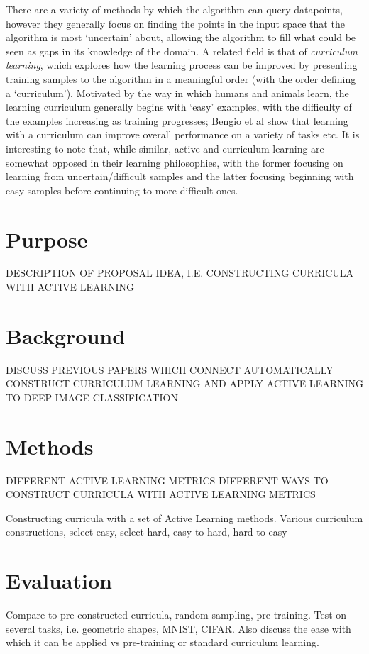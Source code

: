 \documentclass[a4paper,11pt]{article}
\begin{document}
There are a variety of methods by which the algorithm can query datapoints, however they generally focus on finding the points in the input space that the algorithm is most `uncertain' about, allowing the algorithm to fill what could be seen as gaps in its knowledge of the domain. A related field is that of \textit{curriculum learning}, which explores how the learning process can be improved by presenting training samples to the algorithm in a meaningful order (with the order defining a `curriculum'). Motivated by the way in which humans and animals learn, the learning curriculum generally begins with `easy' examples, with the difficulty of the examples increasing as training progresses; Bengio et al show that learning with a curriculum can improve overall performance on a variety of tasks etc. It is interesting to note that, while similar, active and curriculum learning are somewhat opposed in their learning philosophies, with the former focusing on learning from uncertain/difficult samples and the latter focusing beginning with easy samples before continuing to more difficult ones.


\section{Purpose}
DESCRIPTION OF PROPOSAL IDEA, I.E. CONSTRUCTING CURRICULA WITH ACTIVE LEARNING

\section{Background}
DISCUSS PREVIOUS PAPERS WHICH CONNECT AUTOMATICALLY CONSTRUCT CURRICULUM LEARNING AND APPLY ACTIVE LEARNING TO DEEP IMAGE CLASSIFICATION

\section{Methods}
DIFFERENT ACTIVE LEARNING METRICS
DIFFERENT WAYS TO CONSTRUCT CURRICULA WITH ACTIVE LEARNING METRICS

Constructing curricula with a set of Active Learning methods. 
Various curriculum constructions, select easy, select hard, easy to hard, hard to easy

\section{Evaluation}
Compare to pre-constructed curricula, random sampling, pre-training.
Test on several tasks, i.e. geometric shapes, MNIST, CIFAR.
Also discuss the ease with which it can be applied vs pre-training or standard curriculum learning.
\end{document}
